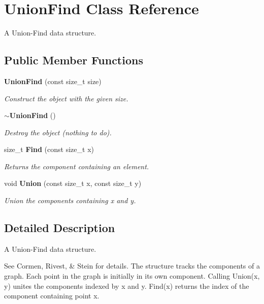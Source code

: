 \section{Union\+Find Class Reference}
\label{classmlpack_1_1emst_1_1UnionFind}


A Union-\/\+Find data structure.  


\subsection*{Public Member Functions}
\begin{DoxyCompactItemize}
\item 
\textbf{ Union\+Find} (const size\+\_\+t size)
\begin{DoxyCompactList}\small\item\em Construct the object with the given size. \end{DoxyCompactList}\item 
\textbf{ $\sim$\+Union\+Find} ()
\begin{DoxyCompactList}\small\item\em Destroy the object (nothing to do). \end{DoxyCompactList}\item 
size\+\_\+t \textbf{ Find} (const size\+\_\+t x)
\begin{DoxyCompactList}\small\item\em Returns the component containing an element. \end{DoxyCompactList}\item 
void \textbf{ Union} (const size\+\_\+t x, const size\+\_\+t y)
\begin{DoxyCompactList}\small\item\em Union the components containing x and y. \end{DoxyCompactList}\end{DoxyCompactItemize}


\subsection{Detailed Description}
A Union-\/\+Find data structure. 

See Cormen, Rivest, \& Stein for details. The structure tracks the components of a graph. Each point in the graph is initially in its own component. Calling Union(x, y) unites the components indexed by x and y. Find(x) returns the index of the component containing point x. 

